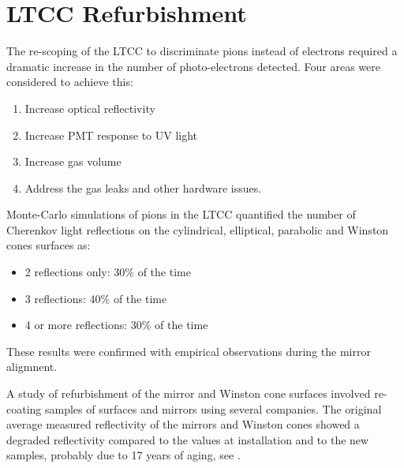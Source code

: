 \section{LTCC Refurbishment}


The re-scoping of the LTCC to discriminate pions instead of electrons required a dramatic increase in the
number of photo-electrons detected. Four areas were considered to achieve this:

\begin{enumerate}
	\item Increase optical reflectivity
	\item Increase PMT response to UV light
	\item Increase gas volume
	\item Address the gas leaks and other hardware issues.
\end{enumerate}


Monte-Carlo simulations of pions in the LTCC quantified the number of Cherenkov light  reflections on the cylindrical, elliptical,
parabolic and Winston cones surfaces as:

\begin{itemize}
	\item 2 reflections only: 30$\%$ of the time
	\item 3 reflections: 40$\%$ of the time
	\item 4 or more reflections: 30$\%$ of the time
\end{itemize}

These results were confirmed with empirical observations during the mirror aligmnent.

A study of refurbishment of the mirror and Winston cone surfaces
involved re-coating samples of surfaces and mirrors using several companies.
The original average measured reflectivity of the mirrors and Winston cones
showed a degraded reflectivity compared to the values at installation and to
the new samples, probably due to  17 years of aging, see .


